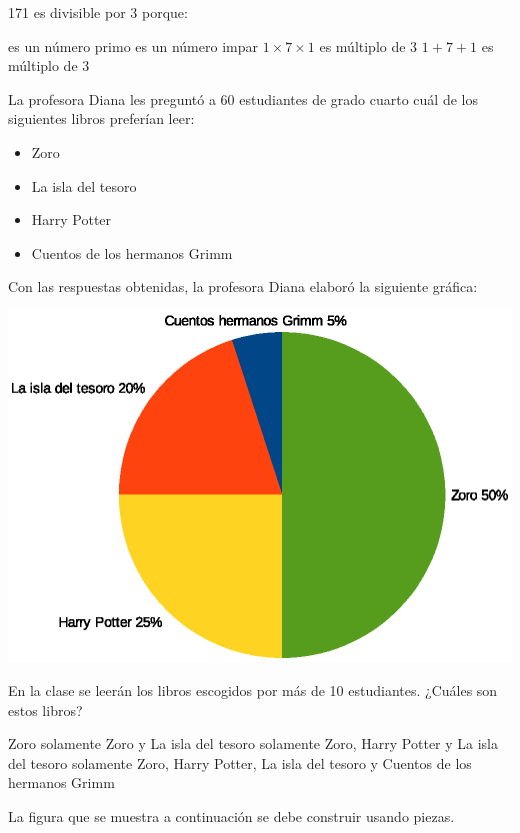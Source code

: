 \documentclass[10pt,addpoints]{exam}
\begin{document}
\begin{multicols}{2}
\begin{questions}
171 es divisible por 3 porque:
\begin{choices}
 es un número primo
 es un número impar
\choice $1 \times 7 \times 1$ es múltiplo de 3
\CorrectChoice $1+7+1$ es múltiplo de 3
\end{choices}
\question La profesora Diana les preguntó a 60 estudiantes de grado cuarto cuál de los siguientes libros preferían leer:
\begin{itemize}
\item Zoro
\item La isla del tesoro
\item Harry Potter
\item Cuentos de los hermanos Grimm
\end{itemize}
Con las respuestas obtenidas, la profesora Diana elaboró la siguiente gráfica:
\begin{center}
\includegraphics[scale=.5]{Images/Pantallazo-23.eps} 
\end{center}
En la clase se leerán los libros escogidos por más de 10 estudiantes. ¿Cuáles son estos libros?
\begin{choices}
\choice Zoro solamente
\choice Zoro y La isla del tesoro solamente
\CorrectChoice Zoro, Harry Potter y La isla del tesoro solamente
\choice Zoro, Harry Potter, La isla del tesoro y Cuentos de los hermanos Grimm
\end{choices}
\question La figura que se muestra a continuación se debe construir usando piezas.
\begin{center}
\end{center}
\end{questions}
\end{multicols}
\end{document}
